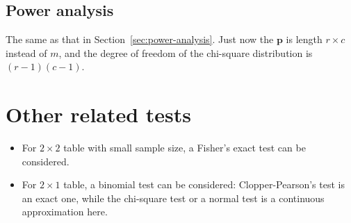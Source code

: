 \documentclass[a4paper,12pt]{article}
\begin{document}
\subsection{Power analysis}
\label{sec:power-analysis-1}

The same as that in Section~\ref{sec:power-analysis}. Just now the $\bm{p}$ is length $r\times c$ instead of $m$, and the degree of freedom of the chi-square distribution is $\left(r - 1\right)\left(c - 1\right)$.

\section{Other related tests}
\label{sec:other-related-tests}

\begin{itemize}
\item For $2\times2$ table with small sample size, a Fisher's exact test can be considered.
\item For $2\times1$ table, a binomial test can be considered: Clopper-Pearson's test is an exact one, while the chi-square test or a normal test is a continuous approximation here.
\end{itemize}




\end{document}

